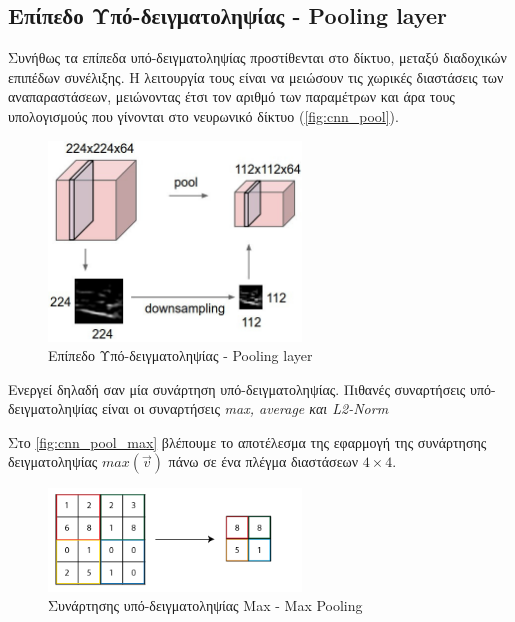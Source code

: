 \subsection{Επίπεδο Υπό-δειγματοληψίας - Pooling layer}

Συνήθως τα επίπεδα υπό-δειγματοληψίας προστίθενται στο δίκτυο, μεταξύ διαδοχικών
επιπέδων συνέλιξης. Η λειτουργία τους είναι να μειώσουν τις χωρικές
διαστάσεις των αναπαραστάσεων, μειώνοντας έτσι τον αριθμό των
παραμέτρων και άρα τους υπολογισμούς που γίνονται στο νευρωνικό δίκτυο
(\autoref{fig:cnn_pool}).

\begin{figure}[!ht]
  \centering
  \includegraphics[width=0.6\textwidth]{./images/chapter3/cnn_pool.jpg}
  \caption[Επίπεδο Υποδειγματοληψίας - Pooling layer]{Επίπεδο Υπό-δειγματοληψίας - Pooling layer}
  \label{fig:cnn_pool}
\end{figure}
Ενεργεί δηλαδή σαν μία συνάρτηση υπό-δειγματοληψίας.
Πιθανές συναρτήσεις υπό-δειγματοληψίας είναι οι συναρτήσεις \emph{max, average και L2-Norm}

Στο \autoref{fig:cnn_pool_max} βλέπουμε το αποτέλεσμα της εφαρμογή της συνάρτησης
δειγματοληψίας $max(\vec{v})$ πάνω σε ένα πλέγμα διαστάσεων $4 \times 4$.

\begin{figure}[!ht]
  \centering
  \includegraphics[width=0.6\textwidth]{./images/chapter3/cnn_pool_max.png}
  \caption[Συνάρτηση υπό-δειγματοληψίας Max - Max Pooling]{Συνάρτησης υπό-δειγματοληψίας Max - Max Pooling}
  \label{fig:cnn_pool_max}
\end{figure}

